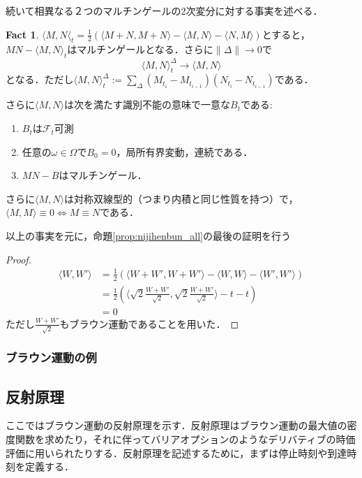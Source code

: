 \documentclass{jsarticle}
\theoremstyle{definition}
\newtheorem{fact}[dfn]{Fact}
\begin{document}
続いて相異なる２つのマルチンゲールの2次変分に対する事実を述べる．
\begin{fact}
    $\langle M, N\langle_t = \frac{1}{2}\left(\langle M+N, M+N\rangle - \langle M, N\rangle - \langle N, M\rangle\right)$とすると，$MN - \langle M, N\rangle_t$はマルチンゲールとなる．さらに$\|\Delta\|\rightarrow 0$で
    $$\langle M, N\rangle_t^{\Delta} \rightarrow \langle M, N\rangle$$
    となる．ただし$\langle M, N\rangle_t^{\Delta} := \sum_{\Delta}(M_{t_i} - M_{t_{i-1}})(N_{t_i} - N_{t_{i-1}})$である．\par
    さらに$\langle M, N\rangle$は次を満たす識別不能の意味で一意な$B_t$である:
    \begin{enumerate}
        \item $B_t$は$\mathscr{F}_t$可測
        \item 任意の$\omega\in\Omega$で$B_0 = 0$，局所有界変動，連続である．
        \item $MN - B$はマルチンゲール．
    \end{enumerate}
    さらに$\langle M, N\rangle$は対称双線型的（つまり内積と同じ性質を持つ）で，$\langle M, M\rangle \equiv 0 \iff M \equiv N$である．
\end{fact}
以上の事実を元に，命題\ref{prop:nijihenbun_all}の最後の証明を行う
\begin{proof}
    \begin{align*}
        \langle W, W' \rangle &= \frac{1}{2} \left(\langle W + W', W + W'\rangle - \langle W, W\rangle - \langle W', W'\rangle\right)\\
        &= \frac{1}{2}\left(\langle\sqrt{2}\frac{W + W'}{\sqrt{2}}, \sqrt{2}\frac{W + W'}{\sqrt{2}}\rangle - t - t\right)\\
        &= 0
    \end{align*}
    ただし$\frac{W+W'}{\sqrt{2}}$もブラウン運動であることを用いた．
\end{proof}
\subsubsection{ブラウン運動の例}

\subsection{反射原理}
ここではブラウン運動の反射原理を示す．反射原理はブラウン運動の最大値の密度関数を求めたり，それに伴ってバリアオプションのようなデリバティブの時価評価に用いられたりする．反射原理を記述するために，まずは停止時刻や到達時刻を定義する．
\end{document}
